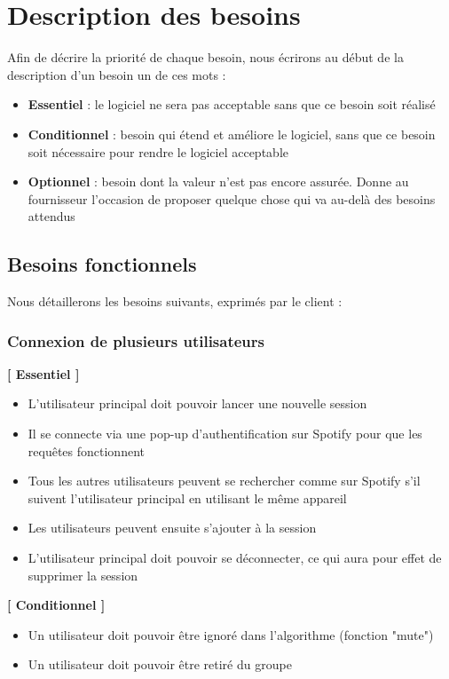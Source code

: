 \documentclass{article}
\begin{document}
		\section{Description des besoins} \label{besoins}
		Afin de décrire la priorité de chaque besoin, nous écrirons au début de la description d'un besoin un de ces mots :
		\begin{itemize}
			\item \textbf{Essentiel} : le logiciel ne sera pas acceptable sans que ce besoin soit réalisé
			\item \textbf{Conditionnel} : besoin qui étend et améliore le logiciel, sans que ce besoin soit nécessaire pour rendre le logiciel acceptable
			\item \textbf{Optionnel} : besoin dont la valeur n’est pas encore assurée. Donne au fournisseur l’occasion de proposer quelque chose qui va au-delà des besoins attendus
		\end{itemize}
		\subsection{Besoins fonctionnels}
		Nous détaillerons les besoins suivants, exprimés par le client :
		\subsubsection{Connexion de plusieurs utilisateurs} \label{connexion}
		\textbf{[ Essentiel ]}
		\begin{itemize}
			\item L'utilisateur principal doit pouvoir lancer une nouvelle session
			\item Il se connecte via une pop-up d'authentification sur Spotify pour que les requêtes fonctionnent 
			\item Tous les autres utilisateurs peuvent se rechercher comme sur Spotify s'il suivent l'utilisateur principal en utilisant le même appareil
			\item Les utilisateurs peuvent ensuite s'ajouter à la session
			\item L'utilisateur principal doit pouvoir se déconnecter, ce qui aura pour effet de supprimer la session
		\end{itemize}
		\textbf{[ Conditionnel ]}
		\begin{itemize}
			\item Un utilisateur doit pouvoir être ignoré dans l'algorithme (fonction "mute")
			\item Un utilisateur doit pouvoir être retiré du groupe
		\end{itemize}
		
\end{document}
